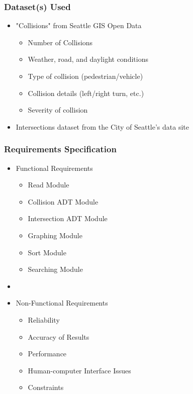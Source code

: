 \documentclass[t,12pt,numbers,fleqn]{beamer}
\begin{document}
\begin{frame}
\frametitle{Dataset(s) Used}
\begin{itemize}
    \item "Collisions" from Seattle GIS Open Data
    \begin{itemize}
        \item Number of Collisions
        \item Weather, road, and daylight conditions
        \item Type of collision (pedestrian/vehicle)
        \item Collision details (left/right turn, etc.)
        \item Severity of collision
    \end{itemize}
    \item Intersections dataset from the City of Seattle's data site
\end{itemize}
\end{frame}
\begin{frame}
\frametitle{Requirements Specification}
\begin{itemize}
    \item Functional Requirements
    \begin{itemize}
        \item Read Module
        \item Collision ADT Module
        \item Intersection ADT Module
        \item Graphing Module
        \item Sort Module
        \item Searching Module
    \end{itemize}
    \item[] %
    \item Non-Functional Requirements
    \begin{itemize}
        \item Reliability
        \item Accuracy of Results
        \item Performance
        \item Human-computer Interface Issues
        \item Constraints
    \end{itemize}
\end{itemize}
\end{frame}
\end{document}
